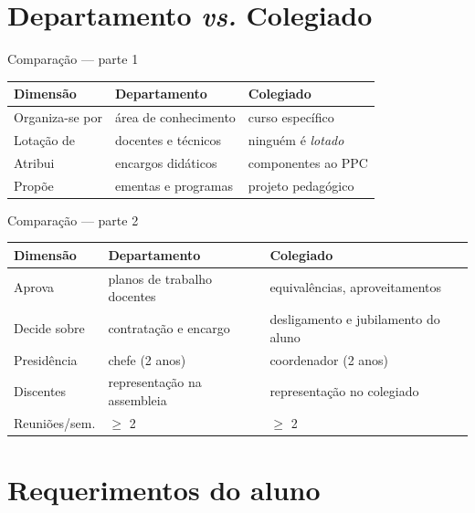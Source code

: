 \documentclass[aspectratio=169]{beamer}
\begin{document}
\section{Departamento {\itshape vs.} Colegiado}

\begin{frame}{Comparação --- parte 1}
  \small
  \renewcommand{\arraystretch}{1.3}
  \begin{tabular}{@{}p{3.2cm} p{4.6cm} p{4.6cm}@{}}
    \toprule
    \textbf{Dimensão} & \textbf{Departamento} & \textbf{Colegiado} \\
    \midrule
    Organiza-se por & área de conhecimento & curso específico \\
    Lotação de & docentes e técnicos & ninguém é \emph{lotado} \\
    Atribui & encargos didáticos & componentes ao PPC \\
    Propõe & ementas e programas & projeto pedagógico \\
    \bottomrule
  \end{tabular}
\end{frame}

\begin{frame}{Comparação --- parte 2}
  \small
  \renewcommand{\arraystretch}{1.3}
  \begin{tabular}{@{}p{3.2cm} p{4.6cm} p{4.6cm}@{}}
    \toprule
    \textbf{Dimensão} & \textbf{Departamento} & \textbf{Colegiado} \\
    \midrule
    Aprova & planos de trabalho docentes & equivalências, aproveitamentos \\
    Decide sobre & contratação e encargo & desligamento e jubilamento do aluno \\
    Presidência & chefe (2 anos) & coordenador (2 anos) \\
    Discentes & representação na assembleia & representação no colegiado \\
    Reuniões/sem. & $\geq$ 2 & $\geq$ 2 \\
    \bottomrule
  \end{tabular}
\end{frame}

\section{Requerimentos do aluno}
\end{document}
